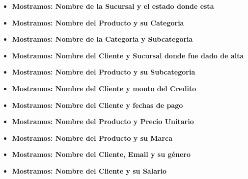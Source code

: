 \documentclass[12pt, fleqn]{article}                             %
\begin{document}
    \begin{itemize}

        \item
            \textbf{Mostramos: Nombre de la Sucursal y el estado donde esta}
            

        \item
            \textbf{Mostramos: Nombre del Producto y su Categoria}
            

        \item
            \textbf{Mostramos: Nombre de la Categoria y Subcategoria}
            

        \item
            \textbf{Mostramos: Nombre del Cliente y Sucursal donde fue dado de alta}
            

        \item
            \textbf{Mostramos: Nombre del Producto y su Subcategoria}
            


        \item
            \textbf{Mostramos: Nombre del Cliente y monto del Credito}
            

        \item
            \textbf{Mostramos: Nombre del Cliente y fechas de pago}
            

        \item
            \textbf{Mostramos: Nombre del Producto y Precio Unitario}
            

        \item
            \textbf{Mostramos: Nombre del Producto y su Marca}
            

        \item
            \textbf{Mostramos: Nombre del Cliente, Email y su género}
            

        \item
            \textbf{Mostramos: Nombre del Cliente y su Salario}
            








\end{itemize}
\end{document}

